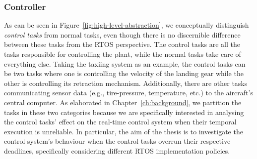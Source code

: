 \subsubsection{Controller}%
%
As can be seen in Figure~\ref{fig:high-level-abstraction}, we conceptually distinguish \emph{control tasks} from normal tasks, even though there is no discernible difference between these tasks from the RTOS perspective.
The control tasks are all the tasks responsible for controlling the plant, while the normal tasks take care of everything else.
Taking the taxiing system as an example, the control tasks can be two tasks where one is controlling the velocity of the landing gear while the other is controlling its retraction mechanism.
Additionally, there are other tasks communicating sensor data (e.g., tire-pressure, temperature, etc.) to the aircraft's central computer.
As elaborated in Chapter~\ref{ch:background}, we partition the tasks in these two categories because we are specifically interested in analysing the control tasks' effect on the real-time control system when their temporal execution is unreliable.
In particular, the aim of the thesis is to investigate the control system's behaviour when the control tasks overrun their respective deadlines, specifically considering different RTOS implementation policies.

